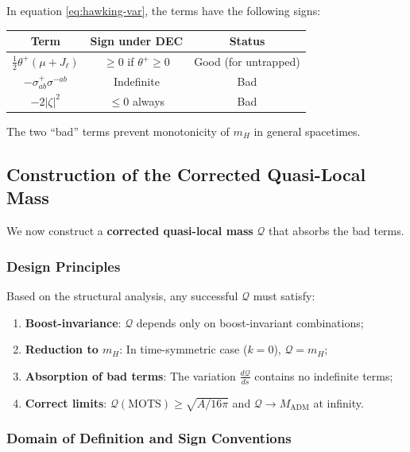 \begin{remark}
\label{rem:bad-terms}
In equation \eqref{eq:hawking-var}, the terms have the following signs:
\begin{center}
\begin{tabular}{c|c|c}
\toprule
\textbf{Term} & \textbf{Sign under DEC} & \textbf{Status} \\
\midrule
$\frac{1}{2}\theta^+(\mu + J_\ell)$ & $\geq 0$ if $\theta^+ \geq 0$ & Good (for untrapped) \\
$-\sigma^+_{ab}\sigma^{-ab}$ & Indefinite & Bad \\
$-2|\zeta|^2$ & $\leq 0$ always & Bad \\
\bottomrule
\end{tabular}
\end{center}
The two ``bad'' terms prevent monotonicity of $m_H$ in general spacetimes.
\end{remark}

\subsection{Construction of the Corrected Quasi-Local Mass}
\label{subsec:corrected-mass}

We now construct a \textbf{corrected quasi-local mass} $\mathcal{Q}$ that absorbs the bad terms.

\subsubsection{Design Principles}

Based on the structural analysis, any successful $\mathcal{Q}$ must satisfy:
\begin{enumerate}[label=\textbf{(D\arabic*)}]
\item \textbf{Boost-invariance}: $\mathcal{Q}$ depends only on boost-invariant combinations;
\item \textbf{Reduction to $m_H$}: In time-symmetric case ($k = 0$), $\mathcal{Q} = m_H$;
\item \textbf{Absorption of bad terms}: The variation $\frac{d\mathcal{Q}}{ds}$ contains no indefinite terms;
\item \textbf{Correct limits}: $\mathcal{Q}(\text{MOTS}) \geq \sqrt{A/16\pi}$ and $\mathcal{Q} \to M_{\text{ADM}}$ at infinity.
\end{enumerate}

\subsubsection{Domain of Definition and Sign Conventions}

